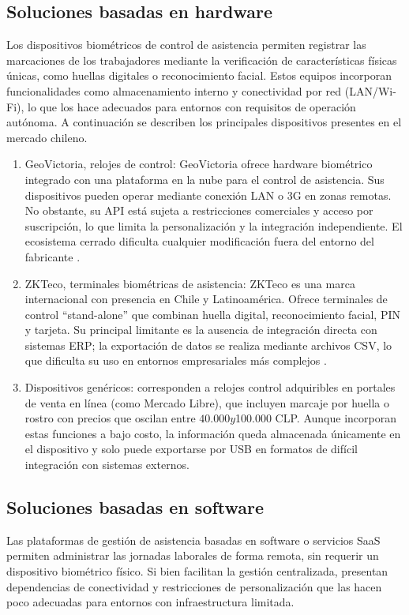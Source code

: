 \documentclass{iccmemoria}
\begin{document}
\subsection{Soluciones basadas en hardware}
Los dispositivos biométricos de control de asistencia permiten registrar las marcaciones de los trabajadores mediante la verificación de características físicas únicas, como huellas digitales o reconocimiento facial. Estos equipos incorporan funcionalidades como almacenamiento interno y conectividad por red (LAN/Wi-Fi), lo que los hace adecuados para entornos con requisitos de operación autónoma. A continuación se describen los principales dispositivos presentes en el mercado chileno.

\begin{enumerate}
    \item GeoVictoria, relojes de control: GeoVictoria ofrece hardware biométrico integrado con una plataforma en la nube para el control de asistencia. Sus dispositivos pueden operar mediante conexión LAN o 3G en zonas remotas. No obstante, su API está sujeta a restricciones comerciales y acceso por suscripción, lo que limita la personalización y la integración independiente. El ecosistema cerrado dificulta cualquier modificación fuera del entorno del fabricante \cite{geovictoria_dispositivos}.
    \item ZKTeco, terminales biométricas de asistencia: ZKTeco es una marca internacional con presencia en Chile y Latinoamérica. Ofrece terminales de control ``stand-alone'' que combinan huella digital, reconocimiento facial, PIN y tarjeta. Su principal limitante es la ausencia de integración directa con sistemas ERP; la exportación de datos se realiza mediante archivos CSV, lo que dificulta su uso en entornos empresariales más complejos \cite{zkteco_tiempoasistencia}.
    \item Dispositivos genéricos: corresponden a relojes control adquiribles en portales de venta en línea (como Mercado Libre), que incluyen marcaje por huella o rostro con precios que oscilan entre $40.000 y $100.000 CLP. Aunque incorporan estas funciones a bajo costo, la información queda almacenada únicamente en el dispositivo y solo puede exportarse por USB en formatos de difícil integración con sistemas externos.
\end{enumerate}

\subsection{Soluciones basadas en software}
Las plataformas de gestión de asistencia basadas en software o servicios SaaS permiten administrar las jornadas laborales de forma remota, sin requerir un dispositivo biométrico físico. Si bien facilitan la gestión centralizada, presentan dependencias de conectividad y restricciones de personalización que las hacen poco adecuadas para entornos con infraestructura limitada.
\end{document}
